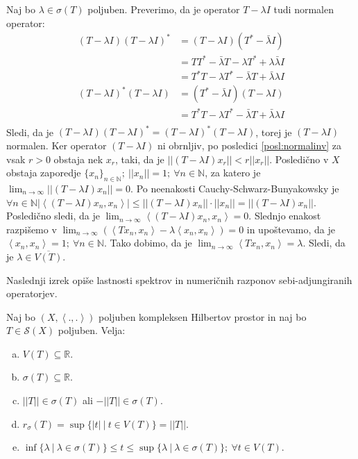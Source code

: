 \documentclass[mat2]{matdelo}
\newcommand{\R}{\mathbb{R}}
\newcommand{\N}{\mathbb{N}}
\newcommand{\abs}[1]{\ensuremath{\lvert #1 \rvert}}
\newcommand{\norm}[1]{\abs{\abs{#1}}}
\newcommand{\Sp}[2]{\ensuremath{\left<#1, #2\right>}}
\begin{document}
		\begin{dokaz}
			Naj bo $\lambda\in\sigma(T)$ poljuben. Preverimo, da je operator $T-\lambda I$ tudi normalen operator: \begin{align*}
				(T-\lambda I)(T - \lambda I)^* &= (T-\lambda I)(T^*-\bar{\lambda} I) \\
				&= TT^* - \bar{\lambda}T -\lambda T^* + \lambda\bar{\lambda} I \\
				&= T^*T -\lambda T^* -\bar{\lambda}T + \bar{\lambda}\lambda I \\
				(T-\lambda I)^*(T - \lambda I) &= (T^*-\bar{\lambda} I)(T-\lambda I) \\
				&= T^*T -\lambda T^* -\bar{\lambda}T + \bar{\lambda}\lambda I \\
			\end{align*}
			Sledi, da je $(T-\lambda I)(T - \lambda I)^* = (T-\lambda I)^*(T - \lambda I)$, torej je $(T-\lambda I)$ normalen. Ker operator $(T - \lambda I)$ ni obrnljiv, po posledici \ref{posl:normalinv} za vsak $r>0$ obstaja nek $x_r$, taki, da je $\norm{(T-\lambda I)x_r}< r\norm{x_r}$. Posledično v $X$ obstaja zaporedje $\{x_n\}_{n\in\N};~\norm{x_n} = 1;~\forall n\in\N$, za katero je $\lim_{n\to\infty}\norm{(T-\lambda I)x_n} = 0$.
			Po neenakosti Cauchy-Schwarz-Bunyakowsky je $\forall n\in\N \abs{\Sp{(T-\lambda I)x_n}{x_n}} \leq \norm{(T-\lambda I)x_n}\cdot\norm{x_n} = \norm{(T-\lambda I)x_n}$. Posledično sledi, da je $\lim_{n\to\infty}\Sp{(T-\lambda I)x_n}{x_n} = 0$. Slednjo enakost razpišemo v $\lim_{n\to\infty}(\Sp{Tx_n}{x_n}-\lambda\Sp{x_n}{x_n})=0$ in upoštevamo, da je $\Sp{x_n}{x_n} = 1;~\forall n\in\N$. Tako dobimo, da je $\lim_{n\to\infty}\Sp{Tx_n}{x_n} = \lambda$. Sledi, da je $\lambda \in \overline{V(T)}$.
		\end{dokaz}
		
		Naslednji izrek opiše lastnosti spektrov in numeričnih razponov sebi-adjungiranih operatorjev.
		
		\begin{izrek}
			\label{izr:sebiadjnumraz}
			Naj bo $(X, \Sp{.}{.})$ poljuben kompleksen Hilbertov prostor in naj bo $T\in \mathcal{S}(X)$ poljuben. Velja: \begin{enumerate}[a)]
				\item $V(T)\subseteq \R$.
				\item $\sigma(T)\subseteq \R$.
				\item $\norm{T}\in\sigma(T)$ ali $-\norm{T}\in\sigma(T)$.
				\item $r_\sigma(T)=\sup\{\abs{t}~|~t\in V(T)\} = \norm{T}$.
				\item $\inf\{\lambda~|~\lambda\in\sigma(T)\} \leq t \leq \sup\{\lambda~|~\lambda\in\sigma(T)\};~\forall t\in V(T)$.
			\end{enumerate}
		\end{izrek}
		
\end{document}
